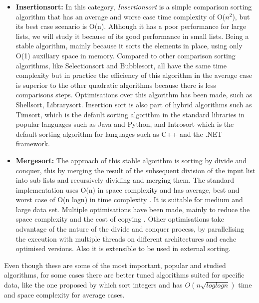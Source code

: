 \documentclass[a4paper,12pt]{article}
\begin{document}
\begin{itemize}
\item {\bf Insertionsort:}  In this category, {\it Insertionsort} is a simple comparison sorting algorithm that has an average and worse case time complexity of O(${n}^2$), but its best case scenario is O(n). Although it has a poor performance for large lists, we will study it because of its good performance in small lists. Being a stable algorithm, mainly because it sorts the elements in place, using only O(1) auxiliary space in memory\cite{knuth1997artInsert}. Compared to other comparison sorting algorithms, like Selectionsort and Bubblesort, all have the same time complexity but in practice the efficiency of this algorithm in the average case is superior to the other quadratic algorithms because there is less comparisons steps. Optimisations over this algorithm has been made, such as Shellsort\cite{knuth1997artShell}, Librarysort\cite{bender2006insertion}. Insertion sort is also part of hybrid algorithms such as Timsort\cite{Timsort}, which is the default sorting algorithm in the standard libraries in popular languages such as Java and Python, and  Introsort\cite{musser1997introspective}  which is the default sorting algorithm for languages such as C++ and the .NET framework.

\item {\bf Mergesort:} The approach of this stable algorithm is sorting by divide and conquer, this by merging the result of the subsequent division of the input list into sub lists and recursively dividing and merging them. The standard implementation uses O(n) in space complexity and has average, best and worst case of O(n logn) in time complexity \cite{knuth1997artMerge}. It is suitable for medium and large data set. Multiple optimisations have been made, mainly to reduce the space complexity and the cost of copying \cite{Huang:1988:PIM:42392.42403}.  Other optimisations take advantage of the nature of the divide and conquer process, by parallelising the execution with multiple threads \cite{chhugani2008efficient} on different architectures and cache optimised versions. Also it is extensible to be used in external sorting.
 \end{itemize}

Even though these are some of the most important, popular and studied algorithms, for some cases there are better tuned algorithms suited for specific data, like the one proposed by \cite{han2002integer}  which sort integers and has {$O(n \sqrt{log log n})$} time and space complexity for average cases.
\end{document}
